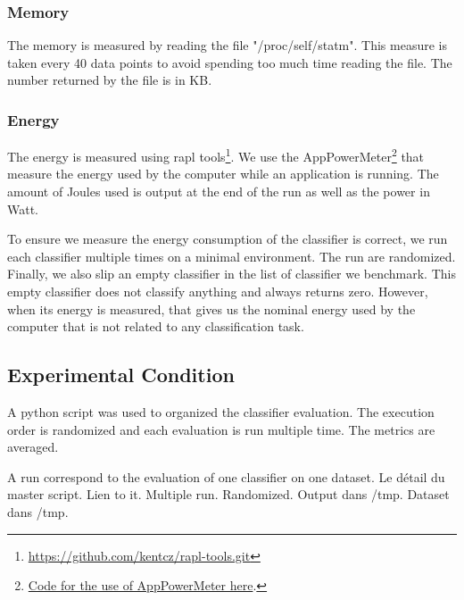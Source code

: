 \subsubsection{Memory}
The memory is measured by reading the file "/proc/self/statm". This measure is
taken every 40 data points to avoid spending too much time reading the file.
The number returned by the file is in KB.

\subsubsection{Energy}
The energy is measured using rapl
tools\footnote{\url{https://github.com/kentcz/rapl-tools.git}}. We use the
AppPowerMeter\footnote{\href{https://github.com/azazel7/paper-benchmark/blob/9adb1039c5a65a00a66d554f0e870d14d3fff7cb/makefile.py\#L122}{Code
for the use of AppPowerMeter here}.} that measure the energy used by the
computer while an application is running. The amount of Joules used is output
at the end of the run as well as the power in Watt.

To ensure we measure the energy consumption of the classifier is
correct, we run each classifier multiple times on a minimal environment. The
run are randomized. Finally, we also slip an empty classifier in the list of
classifier we benchmark. This empty classifier does not classify anything and
always returns zero. However, when its energy is measured, that gives us the
nominal energy used by the computer that is not related to any classification
task.

\subsection{Experimental Condition}
A python script was used to organized the classifier evaluation. 
The execution order is randomized and each evaluation is run multiple time. The metrics are averaged.

A run correspond to the evaluation of one classifier on one dataset.
Le détail du master script. Lien to it. Multiple run. Randomized. Output dans /tmp. Dataset dans /tmp.

